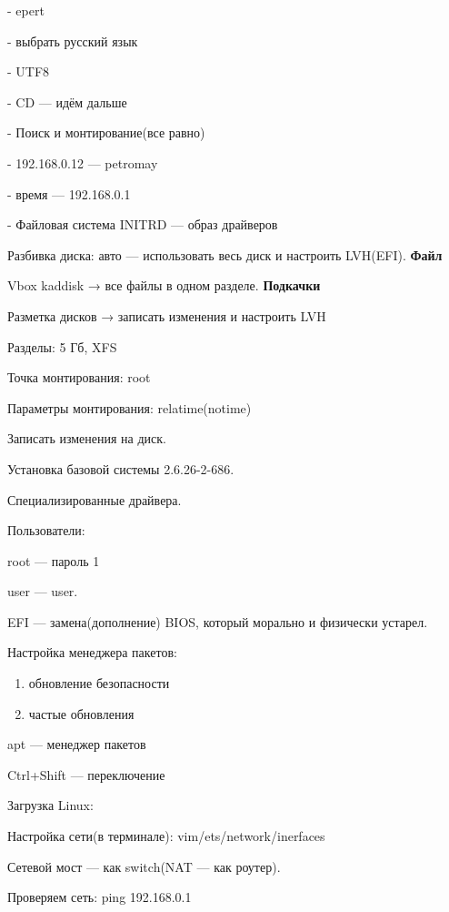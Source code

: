 \par 
- epert
\par 
- выбрать русский язык
\par 
- UTF8
\par 
- CD — идём дальше
\par 
- Поиск и монтирование(все равно)
\par 
- 192.168.0.12 — petromay
\par 
- время — 192.168.0.1 

\par 
- Файловая система INITRD — образ драйверов
\par Разбивка
диска: авто — использовать весь диск и
настроить LVH(EFI).  \textbf{Файл}
\par Vbox
kaddisk →
все файлы в одном разделе.                      
                         \textbf{Подкачки}
\par Разметка
дисков →
записать изменения и настроить LVH
\par 
Разделы: 5 Гб, XFS
\par 
Точка монтирования: root
\par 
Параметры монтирования: relatime(notime)
\par 
Записать изменения на диск.
\par 
Установка базовой системы 2.6.26-2-686.
\par 
Специализированные драйвера.
\par 
Пользователи:
\par 
root — пароль 1
\par 
user — user.
\par 
EFI — замена(дополнение) BIOS, который
морально и физически устарел.
\par 
Настройка менеджера пакетов:
\begin{enumerate}
	\item \par 
	обновление безопасности
	\item \par 
	частые обновления
\end{enumerate}
\par 
apt — менеджер пакетов
\par 
Ctrl+Shift — переключение
\par 
Загрузка Linux:
\par 
Настройка сети(в терминале):
vim/ets/network/inerfaces
\par 
Сетевой мост — как switch(NAT — как роутер).
\par 
Проверяем сеть: ping 192.168.0.1 

